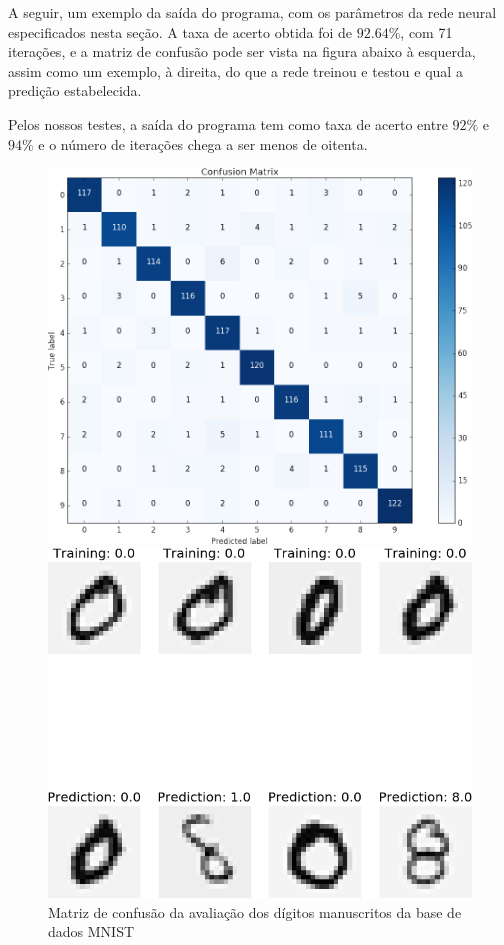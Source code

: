 \documentclass{article}
\begin{document}
            A seguir, um exemplo da saída do programa, com os parâmetros da
            rede neural especificados nesta seção. A taxa de acerto obtida foi
            de $92.64\%$, com 71 iterações, e a matriz de confusão pode ser
            vista na figura abaixo à esquerda, assim como um exemplo, à
            direita, do que a rede treinou e testou e qual a predição
            estabelecida.

            Pelos nossos testes, a saída do programa tem como taxa de acerto
            entre $92\%$ e $94\%$ e o número de iterações chega a ser menos de
            oitenta.

        \begin{figure}[!h]
            \centering
            \begin{minipage}[b]{0.5\textwidth}
                \includegraphics[width=\textwidth]{confusion_matrix.png}
                \caption{Matriz de confusão da avaliação dos dígitos
                manuscritos da base de dados MNIST}
            \end{minipage}
            \hfill
            \begin{minipage}[b]{0.4\textwidth}
                \includegraphics[width=\textwidth]{digits.png}

\end{minipage}
\end{figure}
\end{document}
